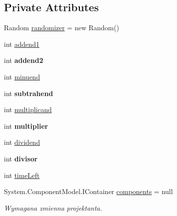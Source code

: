 \subsection*{Private Attributes}
\begin{DoxyCompactItemize}
\item 
Random \mbox{\hyperlink{class_quiz___matematyczny_1_1_test_a1cb283d78aacb645e06657f3829a3143}{randomizer}} = new Random()
\item 
int \mbox{\hyperlink{class_quiz___matematyczny_1_1_test_ae376176ce77896444b1433b0c89e9115}{addend1}}
\item 
\mbox{\label{class_quiz___matematyczny_1_1_test_ae12bfd95fe1e1082808b201c7202a077}} 
int {\bfseries addend2}
\item 
int \mbox{\hyperlink{class_quiz___matematyczny_1_1_test_ac7429358dd52da1a3a4ff0e91612e932}{minuend}}
\item 
\mbox{\label{class_quiz___matematyczny_1_1_test_a9fa7c5ada0fa2c22f46a91c21648290a}} 
int {\bfseries subtrahend}
\item 
int \mbox{\hyperlink{class_quiz___matematyczny_1_1_test_a0b63d668936d6a3b5325e271c80d7aba}{multiplicand}}
\item 
\mbox{\label{class_quiz___matematyczny_1_1_test_acce2f0c0124debafd0b360f3b34df5a0}} 
int {\bfseries multiplier}
\item 
int \mbox{\hyperlink{class_quiz___matematyczny_1_1_test_a215697696c10899f3d101354fd548858}{dividend}}
\item 
\mbox{\label{class_quiz___matematyczny_1_1_test_aabdf2ea5cba5e8e92ebdbe4d7a52b564}} 
int {\bfseries divisor}
\item 
int \mbox{\hyperlink{class_quiz___matematyczny_1_1_test_aea063166ff36647a5ccee5c92c3cb067}{time\+Left}}
\item 
System.\+Component\+Model.\+I\+Container \mbox{\hyperlink{class_quiz___matematyczny_1_1_test_aea27eb0b6dcfbde28e3d708c241b865c}{components}} = null
\begin{DoxyCompactList}\small\item\em Wymagana zmienna projektanta. \end{DoxyCompactList}\item 
\mbox{\label{class_quiz___matematyczny_1_1_test_a933609c23c0682f38e38dbba27be1b23}} 

\end{DoxyCompactItemize}
